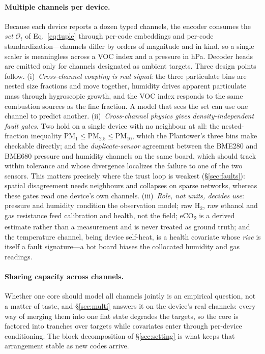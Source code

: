 \documentclass[10pt]{article}
\begin{document}
\paragraph{Multiple channels per device.}
Because each device reports a dozen typed channels, the encoder consumes the
\emph{set} $\mathcal{O}_t$ of Eq.~\eqref{eq:tuple} through per-code embeddings and
per-code standardization---channels differ by orders of magnitude and in kind, so a
single scaler is meaningless across a VOC index and a pressure in hPa. Decoder
heads are emitted only for channels designated as ambient targets. Three design
points follow. (i)~\emph{Cross-channel coupling is real signal}: the three
particulate bins are nested size fractions and move together, humidity drives
apparent particulate mass through hygroscopic growth, and the VOC index responds to
the same combustion sources as the fine fraction. A model that sees the set can use
one channel to predict another. (ii)~\emph{Cross-channel physics gives
density-independent fault gates.} Two hold on a single device with no neighbour at
all: the nested-fraction inequality
$\text{PM}_{1}\!\le\!\text{PM}_{2.5}\!\le\!\text{PM}_{10}$, which the Plantower's
three bins make checkable directly; and the \emph{duplicate-sensor} agreement
between the BME280 and BME680 pressure and humidity channels on the same board,
which should track within tolerance and whose divergence localizes the failure to
one of the two sensors. This matters precisely where the trust loop is weakest
(\S\ref{sec:faults}): spatial disagreement needs neighbours and collapses on sparse
networks, whereas these gates read one device's own channels.
(iii)~\emph{Role, not units, decides use}: pressure and humidity condition the
observation model; raw $\mathrm{H_2}$, raw ethanol and gas resistance feed
calibration and health, not the field; eCO\textsubscript{2} is a derived estimate
rather than a measurement and is never treated as ground truth; and the temperature
channel, being device self-heat, is a health covariate whose \emph{rise} is itself
a fault signature---a hot board biases the collocated humidity and gas readings.

\paragraph{Sharing capacity across channels.}
Whether one core should model all channels jointly is an empirical question, not a
matter of taste, and \S\ref{sec:multi} answers it on the device's real
channels: every way of merging them into one flat state degrades the targets, so
the core is factored into tranches over targets while covariates enter through
per-device conditioning. The block decomposition of \S\ref{sec:setting} is what
keeps that arrangement stable as new codes arrive.
\end{document}
